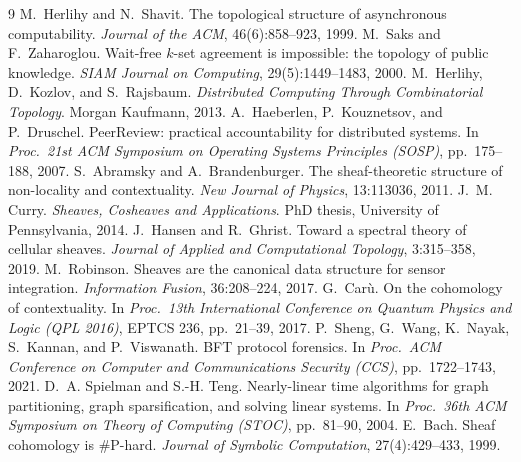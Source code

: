 \documentclass[11pt,a4paper]{article}
\begin{document}
\begin{thebibliography}{9}
 M.~Herlihy and N.~Shavit. The topological structure of asynchronous computability. \emph{Journal
of the ACM}, 46(6):858--923, 1999.
 M.~Saks and F.~Zaharoglou. Wait-free $k$-set agreement is impossible: the topology of public
knowledge. \emph{SIAM Journal on Computing}, 29(5):1449--1483, 2000.
 M.~Herlihy, D.~Kozlov, and S.~Rajsbaum. \emph{Distributed Computing Through
Combinatorial Topology}. Morgan Kaufmann, 2013.
 A.~Haeberlen, P.~Kouznetsov, and P.~Druschel. PeerReview: practical accountability for distributed
systems. In \emph{Proc.\ 21st ACM Symposium on Operating Systems Principles (SOSP)}, pp.~175--188, 2007.
 S.~Abramsky and A.~Brandenburger. The sheaf-theoretic structure of non-locality and
contextuality. \emph{New Journal of Physics}, 13:113036, 2011.
 J.~M. Curry. \emph{Sheaves, Cosheaves and Applications}. PhD thesis, University of Pennsylvania, 2014.
 J.~Hansen and R.~Ghrist. Toward a spectral theory of cellular sheaves. \emph{Journal of Applied
and Computational Topology}, 3:315--358, 2019.
 M.~Robinson. Sheaves are the canonical data structure for sensor integration. \emph{Information
Fusion}, 36:208--224, 2017.
 G.~Car\`u. On the cohomology of contextuality. In \emph{Proc.\ 13th International Conference on Quantum
Physics and Logic (QPL 2016)}, EPTCS 236, pp.~21--39, 2017.
 P.~Sheng, G.~Wang, K.~Nayak, S.~Kannan, and P.~Viswanath. BFT protocol forensics. In \emph{Proc.\ ACM
Conference on Computer and Communications Security (CCS)}, pp.~1722--1743, 2021.
 D.~A. Spielman and S.-H. Teng. Nearly-linear time algorithms for graph partitioning, graph
sparsification, and solving linear systems. In \emph{Proc.\ 36th ACM Symposium on Theory of Computing (STOC)},
pp.~81--90, 2004.
 E.~Bach. Sheaf cohomology is \#P-hard. \emph{Journal of Symbolic Computation}, 27(4):429--433, 1999.
\end{thebibliography}
\end{document}
